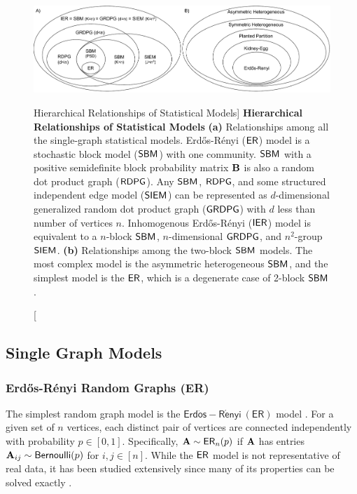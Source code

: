 \begin{figure}
    \centering
    \includegraphics[width=\textwidth]{figures/dnd/models_combined}
    \caption
    [Hierarchical Relationships of Statistical Models]
    {\textbf{Hierarchical Relationships of Statistical Models} 
    \textbf{(a)} Relationships among all the single-graph statistical models. Erd\H os-R\'enyi ($\operatorname{\mathsf{ER}}$) model is a stochastic block model ($\operatorname{\mathsf{SBM}}$) with one community. $\operatorname{\mathsf{SBM}}$ with a positive semidefinite block probability matrix $\operatorname{\mathbf{B}}$ is also a random dot product graph ($\operatorname{\mathsf{RDPG}}$). Any $\operatorname{\mathsf{SBM}}$, $\operatorname{\mathsf{RDPG}}$, and some structured independent edge model ($\operatorname{\mathsf{SIEM}}$) can be represented as $d$-dimensional generalized random dot product graph ($\operatorname{\mathsf{GRDPG}}$) with $d$ less than number of vertices $n$. Inhomogenous Erd\H os-R\'enyi ($\operatorname{\mathsf{IER}}$) model is equivalent to a $n$-block $\operatorname{\mathsf{SBM}}$, $n$-dimensional $\operatorname{\mathsf{GRDPG}}$, and $n^2$-group $\operatorname{\mathsf{SIEM}}$.
    \textbf{(b)} Relationships among the two-block $\operatorname{\mathsf{SBM}}$ models. The most complex model is the asymmetric heterogeneous $\operatorname{\mathsf{SBM}}$, and the simplest model is the $\operatorname{\mathsf{ER}}$, which is a degenerate case of 2-block $\operatorname{\mathsf{SBM}}$.}
    \label{fig:models}
\end{figure}

\subsection{Single Graph Models}\label{sec:single_graph_models}
\subsubsection{Erd\H os-R\'enyi Random Graphs (ER)}\label{sec:uer}
The simplest random graph model is the $\mathsf{Erd\ddot{o}s-R\acute{e}nyi~(ER)}$ model \cite{Erdos1959-zf}. For a given set of $n$ vertices, each distinct pair of vertices are connected independently with probability $p \in [0, 1]$. Specifically, $\operatorname{\mathbf{A}} \sim\operatorname{\mathsf{ER}}_n(p)$ if $\operatorname{\mathbf{A}}$ has entries $\operatorname{\mathbf{A}}_{ij}\sim\operatorname{\mathsf{Bernoulli}}(p)$ for $i, j \in [n]$. While the $\operatorname{\mathsf{ER}}$ model is not representative of real data, it has been studied extensively since many of its properties can be solved exactly  \cite{newman2003random,Rukhin2010}.  

